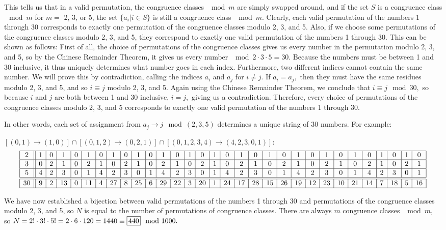 \begin{enumerate}
 This tells us that in a valid permutation, the congruence classes $\mod m$ are simply swapped around, and if the set $S$ is a congruence class $\mod m$ for $m =$ 2, 3, or 5, the set $\{ a_i \vert i \in S \}$ is still a congruence class $\mod m.$ Clearly, each valid permutation of the numbers 1 through 30 corresponds to exactly one permutation of the congruence classes modulo 2, 3, and 5. Also, if we choose some permutations of the congruence classes modulo 2, 3, and 5, they correspond to exactly one valid permutation of the numbers 1 through 30. This can be shown as follows: First of all, the choice of permutations of the congruence classes gives us every number in the permutation modulo 2, 3, and 5, so by the Chinese Remainder Theorem, it gives us every number $\mod 2\cdot 3\cdot 5 = 30.$ Because the numbers must be between 1 and 30 inclusive, it thus uniquely determines what number goes in each index. Furthermore, two different indices cannot contain the same number. We will prove this by contradiction, calling the indices $a_i$ and $a_j$ for $i \neq j.$ If $a_i=a_j,$ then they must have the same residues modulo 2, 3, and 5, and so $i \equiv j$ modulo 2, 3, and 5. Again using the Chinese Remainder Theorem, we conclude that $i \equiv j \mod 30,$ so because $i$ and $j$ are both between 1 and 30 inclusive, $i = j,$ giving us a contradiction. Therefore, every choice of permutations of the congruence classes modulo 2, 3, and 5 corresponds to exactly one valid permutation of the numbers 1 through 30.

 In other words, each set of assignment from $a_j\rightarrow j\mod (2,3,5)$ determines a unique string of $30$ numbers. For example:

 $\left[(0,1)\rightarrow (1,0)\right]\cap\left[(0,1,2)\rightarrow (0,2,1)\right]\cap\left[(0,1,2,3,4)\rightarrow (4,2,3,0,1)\right]$:
 \[\begin{array}{|c||c|c|c|c|c|c|c|c|c|c|c|c|c|c|c|c|c|c|c|c|c|c|c|c|c|c|c|c|c|c|} \hline 2&1&0&1&0&1&0&1&0&1&0&1&0&1&0&1&0&1&0&1&0&1&0&1&0&1&0&1&0&1&0\\ \hline 3&0&2&1&0&2&1&0&2&1&0&2&1&0&2&1&0&2&1&0&2&1&0&2&1&0&2&1&0&2&1\\ \hline 5&4&2&3&0&1&4&2&3&0&1&4&2&3&0&1&4&2&3&0&1&4&2&3&0&1&4&2&3&0&1\\ \hline\hline 30&9&2&13&0&11&4&27&8&25&6&29&22&3&20&1&24&17&28&15&26&19&12&23&10&21&14&7&18&5&16\\ \hline \end{array}\]

 We have now established a bijection between valid permutations of the numbers 1 through 30 and permutations of the congruence classes modulo 2, 3, and 5, so $N$ is equal to the number of permutations of congruence classes. There are always $m$ congruence classes $\mod m,$ so $N = 2! \cdot 3! \cdot 5! = 2 \cdot 6 \cdot 120 = 1440 \equiv \framebox[1.3\width]{440} \mod 1000.$





\end{enumerate}
